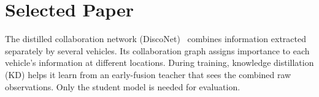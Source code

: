 \section*{Selected Paper}
The distilled collaboration network (DiscoNet)~\cite{li2021disconet} combines information extracted separately by several vehicles.
Its collaboration graph assigns importance to each vehicle's information at different locations.
During training, knowledge distillation (KD) helps it learn from an early-fusion teacher that sees the combined raw observations.
Only the student model is needed for evaluation.
